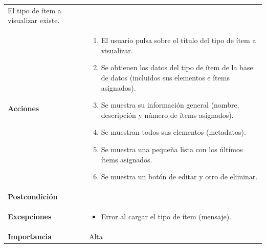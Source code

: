 \documentclass[
]{article}
\providecommand{\tightlist}{%
  \setlength{\itemsep}{0pt}\setlength{\parskip}{0pt}}
\begin{document}
\begin{longtable}[]{@{}ll@{}}
\begin{minipage}[t]{0.76\columnwidth}
El tipo de ítem a visualizar existe.\strut
\end{minipage}\tabularnewline
\begin{minipage}[t]{0.18\columnwidth}\raggedright
\textbf{Acciones}\strut
\end{minipage} & \begin{minipage}[t]{0.76\columnwidth}\raggedright
\begin{enumerate}
\def\labelenumi{\arabic{enumi}.}
\tightlist
\item
  El usuario pulsa sobre el título del tipo de ítem a visualizar.
\item
  Se obtienen los datos del tipo de ítem de la base de datos (incluidos
  sus elementos e ítems asignados).
\item
  Se muestra su información general (nombre, descripción y número de
  ítems asignados).
\item
  Se muestran todos sus elementos (metadatos).
\item
  Se muestra una pequeña lista con los últimos ítems asignados.
\item
  Se muestra un botón de editar y otro de eliminar.
\end{enumerate}\strut
\end{minipage}\tabularnewline
\begin{minipage}[t]{0.18\columnwidth}\raggedright
\textbf{Postcondición}\strut
\end{minipage} & \begin{minipage}[t]{0.76\columnwidth}\raggedright
\strut
\end{minipage}\tabularnewline
\begin{minipage}[t]{0.18\columnwidth}\raggedright
\textbf{Excepciones}\strut
\end{minipage} & \begin{minipage}[t]{0.76\columnwidth}\raggedright
\begin{itemize}
\tightlist
\item
  Error al cargar el tipo de ítem (mensaje).
\end{itemize}\strut
\end{minipage}\tabularnewline
\begin{minipage}[t]{0.18\columnwidth}\raggedright
\textbf{Importancia}\strut
\end{minipage} & \begin{minipage}[t]{0.76\columnwidth}\raggedright
Alta\strut
\end{minipage}\tabularnewline
\bottomrule
\end{longtable}
\end{document}
